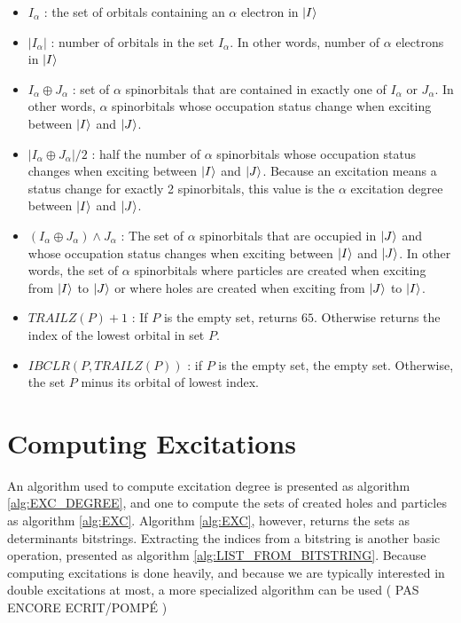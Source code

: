\begin{itemize}
	      
	\item
		$I_{\alpha}$ : the set of orbitals containing an $\alpha$ electron in $\ket I$
	            
	\item
		$|I_{\alpha}|$ : number of orbitals in the set $I_{\alpha}$. In other words, number of $\alpha$ electrons in $\ket I$ 
	            
	\item
		$I_{\alpha} \oplus J_{\alpha}$ : set of $\alpha$ spinorbitals that are contained in exactly one of $I_{\alpha}$ or $J_{\alpha}$. In other words, $\alpha$ spinorbitals whose occupation status change when exciting between $\ket I$ and $\ket J$. 
	            
	\item
		$|I_{\alpha} \oplus J_{\alpha}|/2$ : half the number of $\alpha$ spinorbitals whose occupation status changes when exciting between $\ket I$ and $\ket J$. Because an excitation means a status change for exactly 2 spinorbitals, this value is the $\alpha$ excitation degree between $\ket I$ and $\ket J$.
	            
	\item
		$(I_{\alpha} \oplus J_{\alpha}) \wedge J_{\alpha}$ :
	      The set of $\alpha$ spinorbitals that are occupied in $\ket J$ and whose occupation status changes when exciting between $\ket I$ and $\ket J$. In other words, the set of $\alpha$ spinorbitals where particles are created when exciting from $\ket I$ to $\ket J$ or where holes are created when exciting from $\ket J$ to $\ket I$.
	            
	\item
		$TRAILZ(P)+1$ :
	      If $P$ is the empty set, returns $65$. Otherwise returns the index of the lowest orbital in set $P$.
	            
	\item
		$IBCLR(P,TRAILZ(P))$ :
	      if $P$ is the empty set, the empty set. Otherwise, the set $P$ minus its orbital of lowest index.
\end{itemize}

\section{Computing Excitations}

An algorithm used to compute excitation degree is presented as algorithm \ref{alg:EXC_DEGREE}, and one to compute the sets of created holes and particles as algorithm \ref{alg:EXC}. Algorithm \ref{alg:EXC}, however, returns the sets as determinants bitstrings. Extracting the indices from a bitstring is another basic operation, presented as algorithm \ref{alg:LIST_FROM_BITSTRING}.
Because computing excitations is done heavily, and because we are typically interested in double excitations at most, a more specialized algorithm can be used ( PAS ENCORE ECRIT/POMPÉ )


